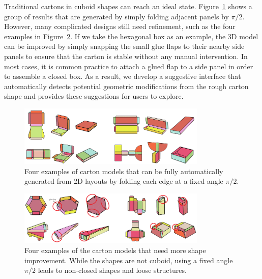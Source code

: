 Traditional cartons in cuboid shapes can reach an ideal state.
Figure~\ref{fig:initial-automatic} shows a group of results that are generated by simply folding adjacent panels by $\pi/2$.
%
However, many complicated designs still need refinement, such as the four examples in Figure~\ref{fig:initial-need-improvement}. 
If we take the hexagonal box as an example, the 3D model can be improved by simply snapping the small glue flaps to their nearby side panels to ensure that the carton is stable without any manual intervention. 
In most cases, it is common practice to attach a glued flap to a side panel in order to assemble a closed box.
%
As a result, we develop a suggestive interface that automatically detects potential geometric modifications from the rough carton shape and provides these suggestions for users to explore.

\begin{figure}
	\centering
	\includegraphics[width=0.8\textwidth]{images/initiala}
	\caption{Four examples of carton models that can be fully automatically generated from 2D layouts by folding each edge at a fixed angle $\pi/2$. }
	\label{fig:initial-automatic}
\end{figure}

 
\begin{figure}
	\centering
	\includegraphics[width=0.8\textwidth]{images/initialb}
	\caption{Four examples of the carton models that need more shape improvement. While the shapes are not cuboid, using a fixed angle $\pi/2$ leads to non-closed shapes and loose structures.}
	\label{fig:initial-need-improvement}
\end{figure}
